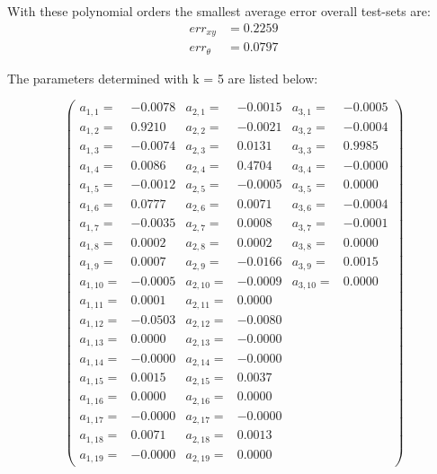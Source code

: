 \documentclass[conference]{IEEEtran}
\begin{document}
\begin{compactenum}[a)]
With these polynomial orders the smallest average error overall test-sets are:
\begin{align}
	err_{xy} & = 0.2259\\
	err_{\theta} & = 0.0797
\end{align}

The parameters determined with k = 5 are listed below:

$$
\left(
\scriptscriptstyle{
\begin{smallmatrix}
a_{1,1} =&   -0.0078&	a_{2,1} =&   -0.0015&	a_{3,1} =&  -0.0005 \\
a_{1,2} =&    0.9210&	a_{2,2} =&   -0.0021&	a_{3,2} =&	-0.0004	\\
a_{1,3} =&   -0.0074& 	a_{2,3} =&    0.0131&	a_{3,3} =&	 0.9985	\\
a_{1,4} =&    0.0086&	a_{2,4} =&    0.4704&	a_{3,4} =&	-0.0000	\\
a_{1,5} =&   -0.0012&	a_{2,5} =&   -0.0005&	a_{3,5} =&	 0.0000	\\
a_{1,6} =&    0.0777&	a_{2,6} =&    0.0071&	a_{3,6} =&	-0.0004	\\
a_{1,7} =&   -0.0035&	a_{2,7} =&    0.0008&	a_{3,7} =&	-0.0001	\\
a_{1,8} =&    0.0002&	a_{2,8} =&    0.0002&	a_{3,8} =&	 0.0000	\\
a_{1,9} =&    0.0007&	a_{2,9} =&   -0.0166&	a_{3,9} =&	 0.0015	\\
a_{1,10} =&   -0.0005&	a_{2,10} =&   -0.0009&	a_{3,10} =&	 0.0000	\\
a_{1,11} =&    0.0001&	a_{2,11} =&    0.0000	\\
a_{1,12} =&   -0.0503&	a_{2,12} =&   -0.0080	\\
a_{1,13} =&    0.0000&	a_{2,13} =&   -0.0000	\\
a_{1,14} =&   -0.0000&	a_{2,14} =&   -0.0000	\\
a_{1,15} =&    0.0015&	a_{2,15} =&    0.0037	\\
a_{1,16} =&    0.0000&	a_{2,16} =&    0.0000	\\
a_{1,17} =&   -0.0000&	a_{2,17} =&   -0.0000	\\
a_{1,18} =&    0.0071&	a_{2,18} =&    0.0013	\\
a_{1,19} =&   -0.0000&	a_{2,19} =&    0.0000	
\end{smallmatrix}}
\right)
$$



\end{compactenum}
\end{document}
